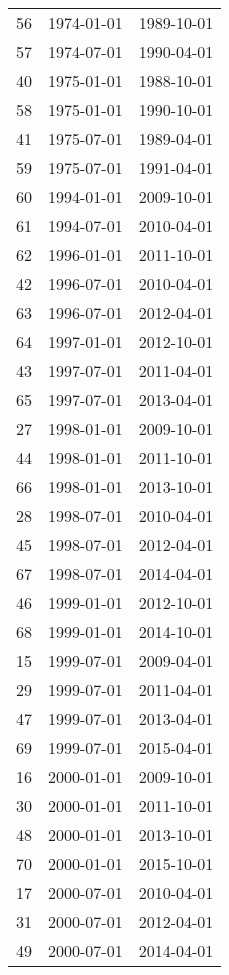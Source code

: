 % 
\begin{tabular}{ccc}
  \hline
  \hline
56 & 1974-01-01 & 1989-10-01 \\ 
  57 & 1974-07-01 & 1990-04-01 \\ 
  40 & 1975-01-01 & 1988-10-01 \\ 
  58 & 1975-01-01 & 1990-10-01 \\ 
  41 & 1975-07-01 & 1989-04-01 \\ 
  59 & 1975-07-01 & 1991-04-01 \\ 
  60 & 1994-01-01 & 2009-10-01 \\ 
  61 & 1994-07-01 & 2010-04-01 \\ 
  62 & 1996-01-01 & 2011-10-01 \\ 
  42 & 1996-07-01 & 2010-04-01 \\ 
  63 & 1996-07-01 & 2012-04-01 \\ 
  64 & 1997-01-01 & 2012-10-01 \\ 
  43 & 1997-07-01 & 2011-04-01 \\ 
  65 & 1997-07-01 & 2013-04-01 \\ 
  27 & 1998-01-01 & 2009-10-01 \\ 
  44 & 1998-01-01 & 2011-10-01 \\ 
  66 & 1998-01-01 & 2013-10-01 \\ 
  28 & 1998-07-01 & 2010-04-01 \\ 
  45 & 1998-07-01 & 2012-04-01 \\ 
  67 & 1998-07-01 & 2014-04-01 \\ 
  46 & 1999-01-01 & 2012-10-01 \\ 
  68 & 1999-01-01 & 2014-10-01 \\ 
  15 & 1999-07-01 & 2009-04-01 \\ 
  29 & 1999-07-01 & 2011-04-01 \\ 
  47 & 1999-07-01 & 2013-04-01 \\ 
  69 & 1999-07-01 & 2015-04-01 \\ 
  16 & 2000-01-01 & 2009-10-01 \\ 
  30 & 2000-01-01 & 2011-10-01 \\ 
  48 & 2000-01-01 & 2013-10-01 \\ 
  70 & 2000-01-01 & 2015-10-01 \\ 
  17 & 2000-07-01 & 2010-04-01 \\ 
  31 & 2000-07-01 & 2012-04-01 \\ 
  49 & 2000-07-01 & 2014-04-01 \\ 

\end{tabular}
